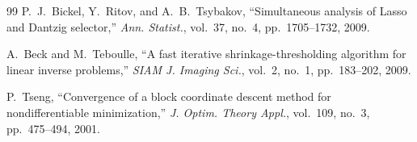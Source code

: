 \documentclass[11pt,a4paper]{article}
\theoremstyle{definition}
\theoremstyle{remark}
\begin{document}
\begin{thebibliography}{99}
P.~J.~Bickel, Y.~Ritov, and A.~B.~Tsybakov,
``Simultaneous analysis of Lasso and Dantzig selector,''
\emph{Ann. Statist.}, vol.~37, no.~4, pp.~1705--1732, 2009.

A.~Beck and M.~Teboulle,
``A fast iterative shrinkage-thresholding algorithm for linear inverse
problems,''
\emph{SIAM J. Imaging Sci.}, vol.~2, no.~1, pp.~183--202, 2009.

P.~Tseng,
``Convergence of a block coordinate descent method for nondifferentiable
minimization,''
\emph{J. Optim. Theory Appl.}, vol.~109, no.~3, pp.~475--494, 2001.

\end{thebibliography}
\end{document}
